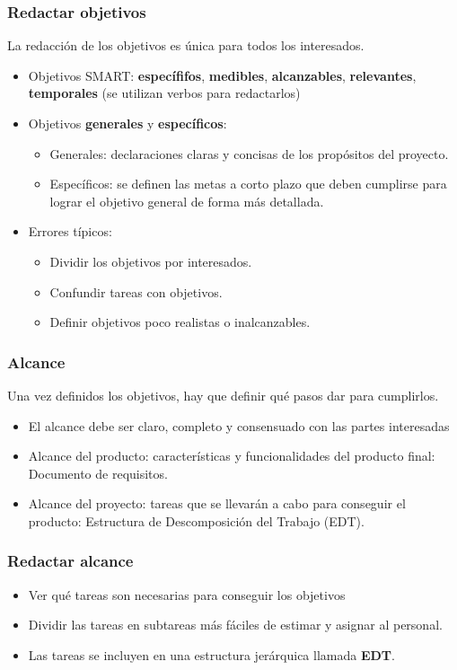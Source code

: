 \documentclass{article}
\begin{document}
\subsubsection{Redactar objetivos}
La redacción de los objetivos es única para todos los interesados.
\begin{itemize}
	\item Objetivos SMART: \textbf{específifos}, \textbf{medibles}, \textbf{alcanzables}, \textbf{relevantes}, \textbf{temporales} (se utilizan verbos para redactarlos)
	\item Objetivos \textbf{generales} y \textbf{específicos}:
	\begin{itemize}
		\item Generales: declaraciones claras y concisas de los propósitos del proyecto.
		\item Específicos: se definen las metas a corto plazo que deben cumplirse para lograr el objetivo general de forma más detallada.
	\end{itemize}
	\item Errores típicos:
	\begin{itemize}
		\item Dividir los objetivos por interesados.
		\item Confundir tareas con objetivos.
		\item Definir objetivos poco realistas o inalcanzables.
	\end{itemize}
\end{itemize}

\subsubsection{Alcance}

Una vez definidos los objetivos, hay que definir qué pasos dar para cumplirlos.
\begin{itemize}
	\item El alcance debe ser claro, completo y consensuado con las partes interesadas
	\item Alcance del producto: características y funcionalidades del producto final: Documento de requisitos.
	\item Alcance del proyecto: tareas que se llevarán a cabo para conseguir el producto: Estructura de Descomposición del Trabajo (EDT).
\end{itemize}

\subsubsection{Redactar alcance}
\begin{itemize}
	\item Ver qué tareas son necesarias para conseguir los objetivos
	\item Dividir las tareas en subtareas más fáciles de estimar y asignar al personal.
	\item Las tareas se incluyen en una estructura jerárquica llamada \textbf{EDT}.
\end{itemize}
\end{document}
